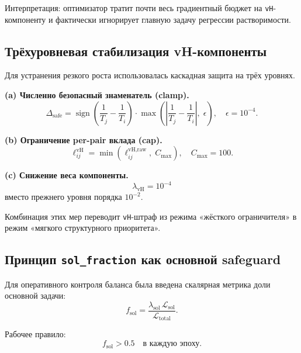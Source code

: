 \documentclass[11pt]{article}
\begin{document}
Интерпретация: оптимизатор тратит почти весь градиентный бюджет на \texttt{vH}-компоненту и фактически игнорирует главную задачу регрессии растворимости.

\subsection{Трёхуровневая стабилизация vH-компоненты}\label{subsec:vh-stabilization}

Для устранения резкого роста использовалась каскадная защита на трёх уровнях.

\textbf{(a) Численно безопасный знаменатель (clamp).}
\begin{equation*}
\Delta_{\text{safe}} = \operatorname{sign}\!\left(\frac{1}{T_j} - \frac{1}{T_i}\right)
\cdot \max\!\left(\left|\frac{1}{T_j} - \frac{1}{T_i}\right|,\; \epsilon\right),
\quad \epsilon = 10^{-4}.
\end{equation*}

\textbf{(b) Ограничение per-pair вклада (cap).}
\begin{equation*}
\ell_{ij}^{\text{vH}} = \min\!\left(\ell_{ij}^{\text{vH,raw}},\; C_{\max}\right),
\quad C_{\max}=100.
\end{equation*}

\textbf{(c) Снижение веса компоненты.}
\begin{equation*}
\lambda_{\text{vH}} = 10^{-4}
\end{equation*}
вместо прежнего уровня порядка $10^{-2}$.

Комбинация этих мер переводит \texttt{vH}-штраф из режима «жёсткого ограничителя» в режим «мягкого структурного приоритета».

\subsection{Принцип \texttt{sol\_fraction} как основной safeguard}
\label{subsec:sol-fraction}

Для оперативного контроля баланса была введена скалярная метрика доли основной задачи:
\begin{equation*}
f_{\text{sol}} = \frac{\lambda_{\text{sol}}\,\mathcal{L}_{\text{sol}}}{\mathcal{L}_{\text{total}}}.
\end{equation*}

Рабочее правило:
\begin{equation*}
f_{\text{sol}} > 0.5 \quad \text{в каждую эпоху}.
\end{equation*}
\end{document}
